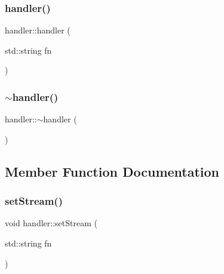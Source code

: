 \mbox{\label{classhandler_a251fbf93fdf9eba4335c2d2b2f425f51}} 
\subsubsection{\texorpdfstring{handler()}{handler()}\hspace{0.1cm}{\footnotesize\ttfamily [2/2]}}
{\footnotesize\ttfamily handler\+::handler (\begin{DoxyParamCaption}\item[{std\+::string}]{fn }\end{DoxyParamCaption})\hspace{0.3cm}{\ttfamily [explicit]}}

\mbox{\label{classhandler_a290cc764503dcc061a43c7be655ed512}} 
\subsubsection{\texorpdfstring{$\sim$handler()}{~handler()}}
{\footnotesize\ttfamily handler\+::$\sim$handler (\begin{DoxyParamCaption}{ }\end{DoxyParamCaption})\hspace{0.3cm}{\ttfamily [virtual]}}



\subsection{Member Function Documentation}
\mbox{\label{classhandler_a4d5c893a4bd43354effd040fd5946186}} 
\subsubsection{\texorpdfstring{set\+Stream()}{setStream()}}
{\footnotesize\ttfamily void handler\+::set\+Stream (\begin{DoxyParamCaption}\item[{std\+::string}]{fn }\end{DoxyParamCaption})}

